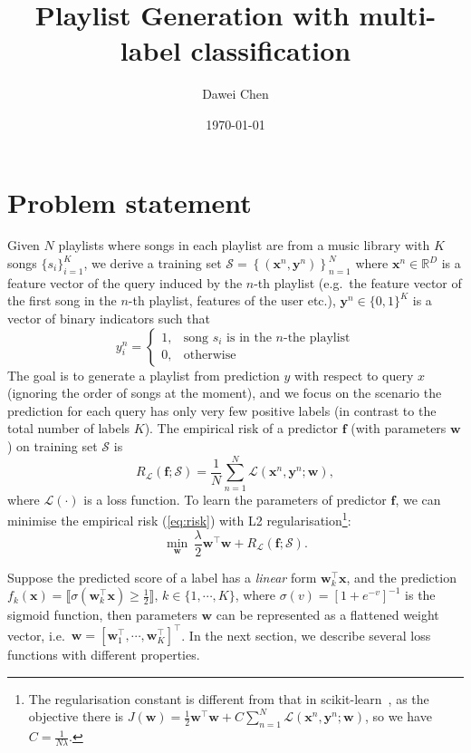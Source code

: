 \documentclass[9pt]{extarticle}
\title{Playlist Generation with multi-label classification}
\author{Dawei Chen}
\date{\today}
\newcommand{\llb}{\llbracket}
\newcommand{\rrb}{\rrbracket}
\newcommand{\f}{\mathbf{f}}
\newcommand{\x}{\mathbf{x}}
\newcommand{\y}{\mathbf{y}}
\newcommand{\1}{\mathbf{1}}
\newcommand{\w}{\mathbf{w}}
\newcommand{\R}{\mathbb{R}}
\newcommand{\LCal}{\mathcal{L}}
\newcommand{\SCal}{\mathcal{S}}
\newcommand{\eg}{e.g.\ }
\newcommand{\ie}{i.e.\ }
\begin{document}
\maketitle


\section{Problem statement}
\label{sec:problem}

Given $N$ playlists where songs in each playlist are from a music library with $K$ songs $\{s_i\}_{i=1}^K$,
we derive a training set $\SCal = \left\{ \left( \x^n, \y^n \right) \right\}_{n=1}^N$ where $\x^n \in \R^D$ is a feature vector of the query 
induced by the $n$-th playlist (\eg the feature vector of the first song in the $n$-th playlist, features of the user etc.),
$\y^n \in \{0,1\}^K$ is a vector of binary indicators such that 
$$
y_i^n = 
\begin{cases}
1, & \text{song $s_i$ is in the $n$-the playlist} \\
0, & \text{otherwise}
\end{cases}
$$
The goal is to generate a playlist from prediction $y$ with respect to query $x$ (ignoring the order of songs at the moment),
and we focus on the scenario the prediction for each query has only very few positive labels (in contrast to the total number of labels $K$).
%
The empirical risk of a predictor $\f$ (with parameters $\w$) on training set $\SCal$ is
\begin{equation}
\label{eq:risk}
R_{\LCal}(\f; \SCal) = \frac{1}{N} \sum_{n=1}^N \LCal (\x^n, \y^n; \w),
\end{equation}
where $\LCal(\cdot)$ is a loss function. %
%
To learn the parameters of predictor $\f$, we can minimise the empirical risk (\ref{eq:risk}) with L2 regularisation\footnote{
The regularisation constant is different from that in scikit-learn~\cite{sklearn-guide}, 
as the objective there is $J(\w) = \frac{1}{2}\w^\top \w + C \sum_{n=1}^N \LCal(\x^n, \y^n; \w)$, so we have $C = \frac{1}{N \lambda}$.}:
\begin{equation}
\label{eq:minrisk_l2}
\min_{\w} \, \frac{\lambda}{2} \w^\top \w + R_{\LCal}(\f; \SCal).
\end{equation}

Suppose the predicted score of a label has a \emph{linear} form $\w_k^\top \x$, 
and the prediction $f_k(\x) = \llb \sigma(\w_k^\top \x) \ge \frac{1}{2} \rrb, \, k \in \{1,\cdots,K\}$,
where $\sigma(v) = [1 + e^{-v}]^{-1}$ is the sigmoid function,
then parameters $\w$ can be represented as a flattened weight vector, \ie $\w  = [\w_1^\top, \cdots, \w_K^\top]^\top$.
In the next section, we describe several loss functions with different properties.
\end{document}
